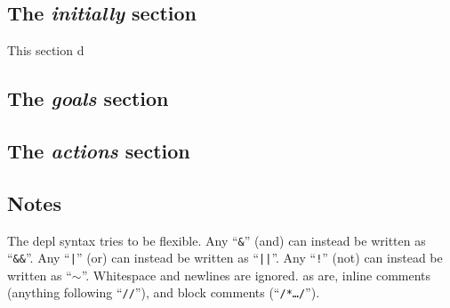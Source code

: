 \documentclass{article}
\begin{document}
\subsection{The \emph{initially} section}

This section d


\subsection{The \emph{goals} section}
\subsection{The \emph{actions} section}

\subsection{Notes}

The depl syntax tries to be flexible.
Any
``\texttt{\&}''
(and) can instead be written as
``\texttt{\&\&}''.
Any
``\texttt{|}''
(or) can instead be written as
``\texttt{||}''.
Any
``\texttt{!}''
(not) can instead be written as
``$\sim$''.
Whitespace and newlines are ignored.
as are, inline comments (anything
following ``\texttt{//}''), and block comments (``\texttt{/*\ldots*/}'').
\end{document}
